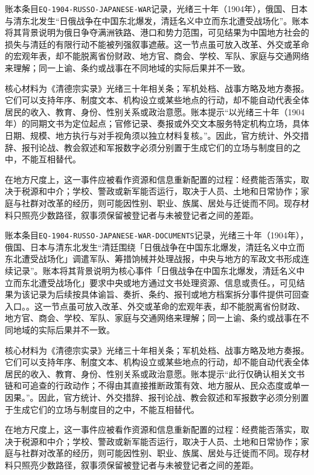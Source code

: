 账本条目\texttt{EQ-1904-RUSSO-JAPANESE-WAR}记录，光绪三十年（1904年），俄国、日本与清东北发生“日俄战争在中国东北爆发，清廷名义中立而东北遭受战场化”。账本将其背景说明为俄日争夺满洲铁路、港口和势力范围，可见结果为中国地方社会的损失与清廷的有限行动不能被列强叙事遮蔽。这一节点虽可放入改革、外交或革命的宏观年表，却不能脱离省份财政、地方官、商会、学校、军队、家庭与交通网络来理解；同一上谕、条约或战事在不同地域的实际后果并不一致。

核心材料为《清德宗实录》光绪三十年相关条；军机处档、战事方略及地方奏报。它们可以支持年序、制度文本、机构设立或某些地点的行动，却不能自动代表全体居民的收入、教育、身份、性别关系或政治意愿。账本提示“以光绪三十年（1904年）的同期文书为定位起点；官修记录、奏报或外交文本服务特定机构立场，具体日期、规模、地方执行与对手视角须以独立材料复核。”。因此，官方统计、外交措辞、报刊论战、教会叙述和军报数字必须分别置于生成它们的立场与制度目的之中，不能互相替代。

在地方尺度上，这一事件应被看作资源和信息重新配置的过程：经费能否落实，取决于税源和中介；学校、警政或新军能否运行，取决于人员、土地和日常协作；家庭与社群对改革的经历，则可能因性别、职业、族属、居处与迁徙而不同。现存材料只照亮少数路径，叙事须保留被登记者与未被登记者之间的差距。

账本条目\texttt{EQ-1904-RUSSO-JAPANESE-WAR-DOCUMENTS}记录，光绪三十年（1904年），俄国、日本与清东北发生“清廷围绕「日俄战争在中国东北爆发，清廷名义中立而东北遭受战场化」调遣军队、筹措饷械并处理战报，中央与地方的军政文书形成连续记录”。账本将其背景说明为核心事件「日俄战争在中国东北爆发，清廷名义中立而东北遭受战场化」要求中央或地方通过文书处理资源、信息或责任。，可见结果为该记录为后续按具体谕旨、奏折、条约、报刊或地方档案拆分事件提供可回查入口。。这一节点虽可放入改革、外交或革命的宏观年表，却不能脱离省份财政、地方官、商会、学校、军队、家庭与交通网络来理解；同一上谕、条约或战事在不同地域的实际后果并不一致。

核心材料为《清德宗实录》光绪三十年相关条；军机处档、战事方略及地方奏报。它们可以支持年序、制度文本、机构设立或某些地点的行动，却不能自动代表全体居民的收入、教育、身份、性别关系或政治意愿。账本提示“此行仅确认相关文书链和可追查的行政动作；不得由其直接推断政策有效、地方服从、民众态度或单一因果。”。因此，官方统计、外交措辞、报刊论战、教会叙述和军报数字必须分别置于生成它们的立场与制度目的之中，不能互相替代。

在地方尺度上，这一事件应被看作资源和信息重新配置的过程：经费能否落实，取决于税源和中介；学校、警政或新军能否运行，取决于人员、土地和日常协作；家庭与社群对改革的经历，则可能因性别、职业、族属、居处与迁徙而不同。现存材料只照亮少数路径，叙事须保留被登记者与未被登记者之间的差距。

